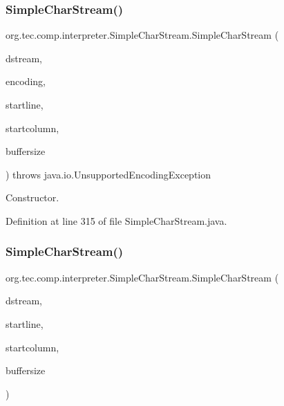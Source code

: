 \subsubsection{\texorpdfstring{Simple\+Char\+Stream()}{SimpleCharStream()}\hspace{0.1cm}{\footnotesize\ttfamily [4/9]}}
{\footnotesize\ttfamily org.\+tec.\+comp.\+interpreter.\+Simple\+Char\+Stream.\+Simple\+Char\+Stream (\begin{DoxyParamCaption}\item[{java.\+io.\+Input\+Stream}]{dstream,  }\item[{String}]{encoding,  }\item[{int}]{startline,  }\item[{int}]{startcolumn,  }\item[{int}]{buffersize }\end{DoxyParamCaption}) throws java.\+io.\+Unsupported\+Encoding\+Exception\hspace{0.3cm}{\ttfamily [inline]}}

Constructor. 

Definition at line 315 of file Simple\+Char\+Stream.\+java.

\mbox{\label{classorg_1_1tec_1_1comp_1_1interpreter_1_1_simple_char_stream_a691cbf70131a5091cc1f137925b53b31}} 
\subsubsection{\texorpdfstring{Simple\+Char\+Stream()}{SimpleCharStream()}\hspace{0.1cm}{\footnotesize\ttfamily [5/9]}}
{\footnotesize\ttfamily org.\+tec.\+comp.\+interpreter.\+Simple\+Char\+Stream.\+Simple\+Char\+Stream (\begin{DoxyParamCaption}\item[{java.\+io.\+Input\+Stream}]{dstream,  }\item[{int}]{startline,  }\item[{int}]{startcolumn,  }\item[{int}]{buffersize }\end{DoxyParamCaption})\hspace{0.3cm}{\ttfamily [inline]}}

